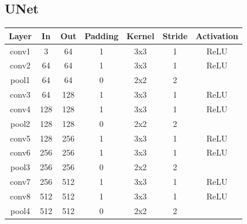 \subsection*{UNet}
\begin{table}[htbp]
	\centering
	\label{tab:unet}
	\setlength{\abovecaptionskip}{10pt}
	\begin{tabular}{|c|c|c|c|c|c|c|}
		\hline
		\textbf{Layer} & \textbf{In} & \textbf{Out} & \textbf{Padding} & \textbf{Kernel} & \textbf{Stride} & \textbf{Activation} \\ \hline
		conv1          & 3           & 64           & 1                & 3x3             & 1               & ReLU                \\ \hline
		conv2          & 64          & 64           & 1                & 3x3             & 1               & ReLU                \\ \hline
		pool1          & 64          & 64           & 0                & 2x2             & 2               &                     \\ \hline
		conv3          & 64          & 128          & 1                & 3x3             & 1               & ReLU                \\ \hline
		conv4          & 128         & 128          & 1                & 3x3             & 1               & ReLU                \\ \hline
		pool2          & 128         & 128          & 0                & 2x2             & 2               &                     \\ \hline
		conv5          & 128         & 256          & 1                & 3x3             & 1               & ReLU                \\ \hline
		conv6          & 256         & 256          & 1                & 3x3             & 1               & ReLU                \\ \hline
		pool3          & 256         & 256          & 0                & 2x2             & 2               &                     \\ \hline
		conv7          & 256         & 512          & 1                & 3x3             & 1               & ReLU                \\ \hline
		conv8          & 512         & 512          & 1                & 3x3             & 1               & ReLU                \\ \hline
		pool4          & 512         & 512          & 0                & 2x2             & 2               &                     \\ \hline

\end{tabular}
\end{table}
